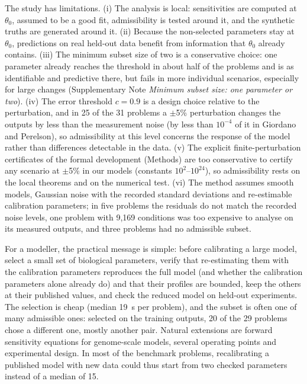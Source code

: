\documentclass[pdflatex,sn-nature]{sn-jnl}
\theoremstyle{plain}
\begin{document}
The study has limitations. (i) The analysis is local: sensitivities are computed at $\theta_0$, assumed to be a good fit, admissibility is tested around it, and the synthetic truths are generated around it. (ii) Because the non-selected parameters stay at $\theta_0$, predictions on real held-out data benefit from information that $\theta_0$ already contains. (iii) The minimum subset size of two is a conservative choice: one parameter already reaches the threshold in about half of the problems and is as identifiable and predictive there, but fails in more individual scenarios, especially for large changes (Supplementary Note \textit{Minimum subset size: one parameter or two}). (iv) The error threshold $c=0.9$ is a design choice relative to the perturbation, and in 25 of the 31 problems a $\pm$5\% perturbation changes the outputs by less than the measurement noise (by less than $10^{-4}$ of it in Giordano and Perelson), so admissibility at this level concerns the response of the model rather than differences detectable in the data. (v) The explicit finite-perturbation certificates of the formal development (Methods) are too conservative to certify any scenario at $\pm$5\% in our models (constants $10^2$--$10^{24}$), so admissibility rests on the local theorems and on the numerical test. (vi) The method assumes smooth models, Gaussian noise with the recorded standard deviations and re-estimable calibration parameters; in five problems the residuals do not match the recorded noise levels, one problem with 9,169 conditions was too expensive to analyse on its measured outputs, and three problems had no admissible subset.

For a modeller, the practical message is simple: before calibrating a large model, select a small set of biological parameters, verify that re-estimating them with the calibration parameters reproduces the full model (and whether the calibration parameters alone already do) and that their profiles are bounded, keep the others at their published values, and check the reduced model on held-out experiments. The selection is cheap (median 19~s per problem), and the subset is often one of many admissible ones: selected on the training outputs, 20 of the 29 problems chose a different one, mostly another pair. Natural extensions are forward sensitivity equations for genome-scale models\cite{bib12}, several operating points and experimental design\cite{bib28}. In most of the benchmark problems, recalibrating a published model with new data could thus start from two checked parameters instead of a median of 15.
\end{document}
